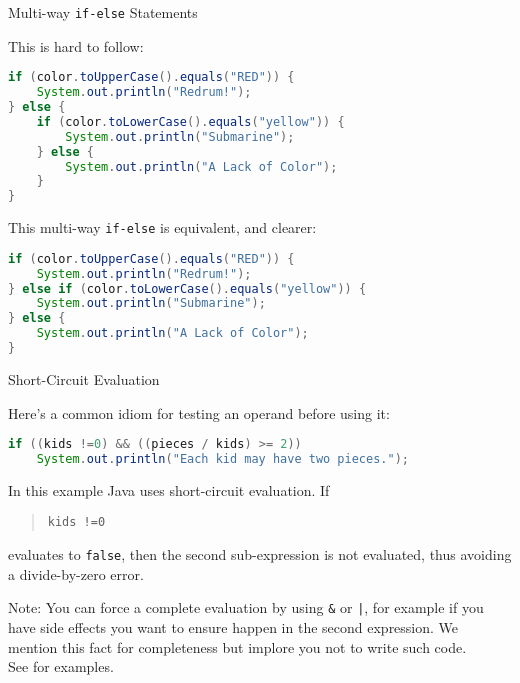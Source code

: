 \documentclass{beamer}
\begin{document}
\begin{frame}[fragile]{Multi-way {\tt if-else} Statements}


This is hard to follow:
\begin{lstlisting}[language=Java]
if (color.toUpperCase().equals("RED")) {
    System.out.println("Redrum!");
} else {
    if (color.toLowerCase().equals("yellow")) {
        System.out.println("Submarine");
    } else {
        System.out.println("A Lack of Color");
    }
}
\end{lstlisting}
\vspace{-.05in}
This multi-way {\tt if-else} is equivalent, and clearer:
\vspace{-.05in}
\begin{lstlisting}[language=Java]
if (color.toUpperCase().equals("RED")) {
    System.out.println("Redrum!");
} else if (color.toLowerCase().equals("yellow")) {
    System.out.println("Submarine");
} else {
    System.out.println("A Lack of Color");
}
\end{lstlisting}

\end{frame}

\begin{frame}[fragile]{Short-Circuit Evaluation}

Here's a common idiom for testing an operand before using it:
\begin{lstlisting}[language=Java]
if ((kids !=0) && ((pieces / kids) >= 2))
    System.out.println("Each kid may have two pieces.");
\end{lstlisting}

In this example Java uses short-circuit evaluation.  If
\begin{quote}
{\tt kids !=0}\\
\end{quote}
evaluates to {\tt false}, then the second sub-expression is not evaluated, thus avoiding a divide-by-zero error.

\vspace{.1in}
Note: You can force a complete evaluation by using {\tt \&} or {\tt |}, for example if you have side effects you want to ensure happen in the second expression.  We mention this fact for completeness but implore you not to write such code.\\

See  for examples.

\end{frame}
\end{document}
